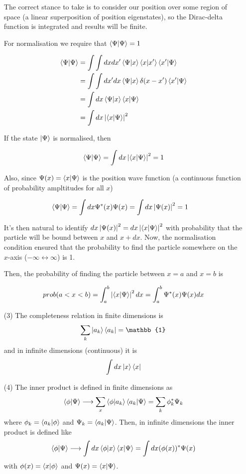 \documentclass[english, 11pt]{article}
\begin{document}
\begin{itemize}
      The correct stance to take is to consider our position over some region of space (a linear superposition of position eigenstates), so the Dirac-delta function is integrated and results will be finite.
      \newline

      For normalisation we require that $\braket{\Psi}{\Psi} = 1$

      \begin{align*}
        \braket{\Psi}{\Psi} & = \int \int dx dx' \braket{\Psi}{x}\braket{x}{x'}\braket{x'}{\Psi} \\
                            & = \int \int dx' dx \braket{\Psi}{x}\delta(x-x')\braket{x'}{\Psi} \\
                            & = \int dx \braket{\Psi}{x}\braket{x}{\Psi} \\
                            & = \int dx \pr{\braket{x}{\Psi}}
      \end{align*}

      If the state $\left|\Psi\right\rangle$ is normalised, then

      \[ \braket{\Psi}{\Psi} = \int dx \pr{\braket{x}{\Psi}} = 1 \]

      Also, since $\Psi(x) = \braket{x}{\Psi}$ is the position wave function (a continuous function of probability ampltitudes for all $x$)

      \begin{align*}
        \braket{\Psi}{\Psi} & = \int dx \Psi^*(x)\Psi(x) = \int dx \pr{\Psi(x)} = 1
      \end{align*}

      It's then natural to identify $dx \pr{\Psi(x)} = dx \pr{\braket{x}{\Psi}}$ with probability that the particle will be bound between $x$ and $x + dx$. Now, the normalisation condition ensured that the probability to find the particle somewhere on the $x$-axis ($-\infty \leftrightarrow \infty$) is 1.

      Then, the probability of finding the particle between $x=a$ and $x=b$ is

      \[ prob(a<x<b) = \int_a^b \pr{\braket{x}{\Psi}} dx = \int_a^b \Psi^*(x)\Psi(x) dx \]

      \item[(3)] The completeness relation in finite dimensions is
      \[ \sum_k \ket{a_k}\bra{a_k} = \mathbb{1} \]
      and in infinite dimensions (continuous) it is
      \[ \int dx \left|x\right\rangle\left\langle x\right| \]

      \item[(4)] The inner product is defined in finite dimensions as
      \[ \braket{\phi}{\Psi} \longrightarrow \sum_x \braket{\phi}{a_k}\braket{a_k}{\Psi} = \sum_k \phi_k^*\Psi_k \]
      where $\phi_k = \braket{a_k}{\phi}$ and $\Psi_k = \braket{a_k}{\Psi}$. Then, in infinite dimensions the inner product is defined like
      \[ \braket{\phi}{\Psi} \longrightarrow \int dx \braket{\phi}{x}\braket{x}{\Psi} = \int dx (\phi(x))^*\Psi(x)  \]
      with $\phi(x) = \braket{x}{\phi}$ and $\Psi(x) = \braket{x}{\Psi}$.


\end{itemize}
\end{document}
